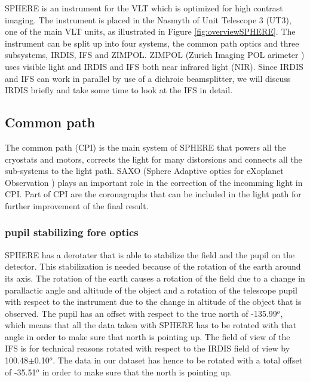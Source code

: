 \documentclass[twoside,single]{lion-msc}
\begin{document}
SPHERE is an instrument for the VLT which is optimized for high contrast imaging. The instrument is placed in the Nasmyth of Unit Telescope 3 (UT3), one of the main VLT units, as illustrated in Figure \ref{fig:overviewSPHERE}. The instrument can be split up into four systems, the common path optics and three subsystems, IRDIS, IFS and ZIMPOL. ZIMPOL (Zurich Imaging POL arimeter \cite{Thalmann2008}) uses visible light and IRDIS and IFS both near infrared light (NIR). Since IRDIS and IFS can work in parallel by use of a dichroic beamsplitter, we will discuss IRDIS briefly and take some time to look at the IFS in detail.

\subsection{Common path}
The common path (CPI) is the main system of SPHERE that powers all the cryostats and motors, corrects the light for many distorsions and connects all the sub-systems to the light path. SAXO (Sphere Adaptive optics for eXoplanet Observation \citep{Sauvage2010}) plays an important role in the correction of the incomming light in CPI. Part of CPI are the coronagraphs that can be included in the light path for further improvement of the final result.

\subsubsection{pupil stabilizing fore optics}
SPHERE has a derotater that is able to stabilize the field and the pupil on the detector. This stabilization is needed because of the rotation of the earth around its axis. The rotation of the earth causes a rotation of the field due to a change in parallactic angle and altitude of the object and a rotation of the telescope pupil with respect to the instrument due to the change in altitude of the object that is observed. The pupil has an offset with respect to the true north of -135.99$^o$, which means that all the data taken with SPHERE has to be rotated with that angle in order to make sure that north is pointing up. The field of view of the IFS is for technical reasons rotated with respect to the IRDIS field of view by 100.48$\pm$0.10$^o$. The data in our dataset has hence to be rotated with a total offset of -35.51$^o$ in order to make sure that the north is pointing up\cite{Maire2016}.
\bigskip
\end{document}

